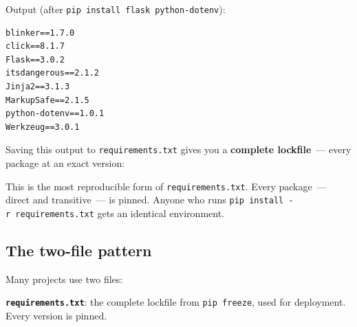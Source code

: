 \begin{codebox}[short]

\begin{Shaded}
\begin{Highlighting}[]
\end{Highlighting}
\end{Shaded}

\end{codebox}

\noindent{}Output (after \texttt{pip\ install\ flask\ python-}\allowbreak{}\texttt{dotenv}):

\begin{outputbox}[short]
\begin{Verbatim}[fontsize=\codesize, breaklines, breakanywhere, breaksymbolleft={\tiny\textcolor{muted}{$\hookrightarrow$}}]
blinker==1.7.0
click==8.1.7
Flask==3.0.2
itsdangerous==2.1.2
Jinja2==3.1.3
MarkupSafe==2.1.5
python-dotenv==1.0.1
Werkzeug==3.0.1
\end{Verbatim}
\end{outputbox}

\noindent{}Saving this output to \texttt{requirements.txt} gives you a \textbf{complete lockfile}~--- every package at an exact version:

\begin{codebox}[short]

\begin{Shaded}
\begin{Highlighting}[]
\OperatorTok{\textgreater{}}
\end{Highlighting}
\end{Shaded}

\end{codebox}

\noindent{}This is the most reproducible form of \texttt{requirements.txt}. Every package~--- direct and transitive~--- is pinned. Anyone who runs \texttt{pip\ install\ -}\allowbreak{}\texttt{r\ requirements.}\allowbreak{}\texttt{txt} gets an identical environment.

\subsection*{The two-file pattern}\label{12-dependency-declaration:the-two-file-pattern}

Many projects use two files:

\textbf{\texttt{requirements.txt}}: the complete lockfile from \texttt{pip\ freeze}, used for deployment. Every version is pinned.

